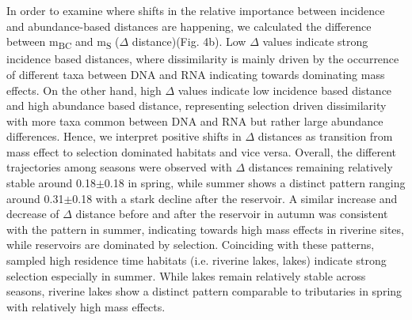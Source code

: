 \documentclass[12pt,a4paper]{article} %
\begin{document}
In order to examine where shifts in the relative importance between incidence and abundance-based distances are happening, we calculated the difference between m\textsubscript{BC} and m\textsubscript{S} ($\Delta$ distance)(Fig. 4b). Low $\Delta$ values indicate strong incidence based distances, where dissimilarity is mainly driven by the occurrence of different taxa between DNA and RNA indicating towards dominating mass effects. On the other hand, high $\Delta$ values indicate low incidence based distance and high abundance based distance, representing selection driven dissimilarity with more taxa common between DNA and RNA but rather large abundance differences. Hence, we interpret positive shifts in $\Delta$ distances as transition from mass effect to selection dominated habitats and vice versa. Overall, the different trajectories among seasons were observed with $\Delta$ distances remaining relatively stable around 0.18$\pm$0.18 in spring, while summer shows a distinct pattern ranging around 0.31$\pm$0.18 with a stark decline after the reservoir. A similar increase and decrease of $\Delta$ distance before and after the reservoir in autumn was consistent with the pattern in summer, indicating towards high mass effects in riverine sites, while reservoirs are dominated by selection. Coinciding with these patterns, sampled high residence time habitats (i.e. riverine lakes, lakes) indicate strong selection especially in summer. While lakes remain relatively stable across seasons, riverine lakes show a distinct pattern comparable to tributaries in spring with relatively high mass effects.
\end{document}
